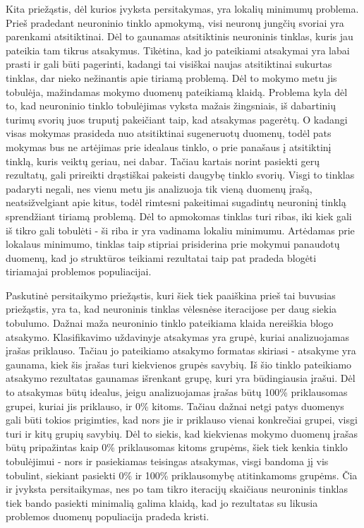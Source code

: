\documentclass{VUMIFPSbakalaurinis}
\begin{document}
Kita priežąstis, dėl kurios įvyksta persitakymas, yra lokalių minimumų problema.
Prieš pradedant neuroninio tinklo apmokymą, visi neuronų jungčių svoriai yra parenkami atsitiktinai.
Dėl to gaunamas atsitiktinis neuroninis tinklas, kuris jau pateikia tam tikrus atsakymus.
Tikėtina, kad jo pateikiami atsakymai yra labai prasti ir gali būti pagerinti, kadangi tai visiškai naujas atsitiktinai sukurtas tinklas, dar nieko nežinantis apie tiriamą problemą.
Dėl to mokymo metu jis tobulėja, mažindamas mokymo duomenų pateikiamą klaidą.
Problema kyla dėl to, kad neuroninio tinklo tobulėjimas vyksta mažais žingsniais, iš dabartinių turimų svorių juos truputį pakeičiant taip, kad atsakymas pagerėtų.
O kadangi visas mokymas prasideda nuo atsitiktinai sugeneruotų duomenų, todėl pats mokymas bus ne artėjimas prie idealaus tinklo, o prie panašaus į atsitiktinį tinklą, kuris veiktų geriau, nei dabar.
Tačiau kartais norint pasiekti gerų rezultatų, gali prireikti drąstiškai pakeisti daugybę tinklo svorių.
Visgi to tinklas padaryti negali, nes vienu metu jis analizuoja tik vieną duomenų įrašą, neatsižvelgiant apie kitus, todėl rimtesni pakeitimai sugadintų neuroninį tinklą sprendžiant tiriamą problemą.
Dėl to apmokomas tinklas turi ribas, iki kiek gali iš tikro gali tobulėti - ši riba ir yra vadinama lokaliu minimumu.
Artėdamas prie lokalaus minimumo, tinklas taip stipriai prisiderina prie mokymui panaudotų duomenų, kad jo struktūros teikiami rezultatai taip pat pradeda blogėti tiriamajai problemos populiacijai.

Paskutinė persitaikymo priežąstis, kuri šiek tiek paaiškina prieš tai buvusias priežąstis, yra ta, kad neuroninis tinklas vėlesnėse iteracijose per daug siekia tobulumo.
Dažnai maža neuroninio tinklo pateikiama klaida nereiškia blogo atsakymo.
Klasifikavimo uždavinyje atsakymas yra grupė, kuriai analizuojamas įrašas priklauso.
Tačiau jo pateikiamo atsakymo formatas skiriasi - atsakyme yra gaunama, kiek šis įrašas turi kiekvienos grupės savybių.
Iš šio tinklo pateikiamo atsakymo rezultatas gaunamas išrenkant grupę, kuri yra būdingiausia įrašui.
Dėl to atsakymas būtų idealus, jeigu analizuojamas įrašas būtų 100\% priklausomas grupei, kuriai jis priklauso, ir 0\% kitoms.
Tačiau dažnai netgi patys duomenys gali būti tokios prigimties, kad nors jie ir priklauso vienai konkrečiai grupei, visgi turi ir kitų grupių savybių.
Dėl to siekis, kad kiekvienas mokymo duomenų įrašas būtų pripažintas kaip 0\% priklausomas kitoms grupėms, šiek tiek kenkia tinklo tobulėjimui - nors ir pasiekiamas teisingas atsakymas, visgi bandoma jį vis tobulint, siekiant pasiekti 0\% ir 100\% priklausomybę atitinkamoms grupėms.
Čia ir įvyksta persitaikymas, nes po tam tikro iteracijų skaičiaus neuroninis tinklas tiek bando pasiekti minimalią galima klaidą, kad jo rezultatas su likusia problemos duomenų populiacija pradeda kristi.
\end{document}
